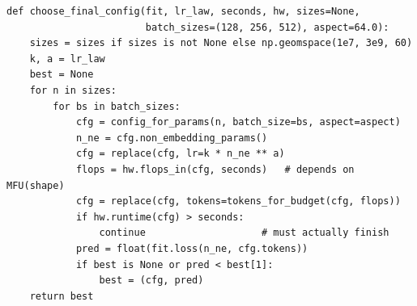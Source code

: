 \begin{lstlisting}[caption={Wall-clock-aware final choice (Lab 15, Task 9).},label={lst:scalinglaws:choose}]
def choose_final_config(fit, lr_law, seconds, hw, sizes=None,
                        batch_sizes=(128, 256, 512), aspect=64.0):
    sizes = sizes if sizes is not None else np.geomspace(1e7, 3e9, 60)
    k, a = lr_law
    best = None
    for n in sizes:
        for bs in batch_sizes:
            cfg = config_for_params(n, batch_size=bs, aspect=aspect)
            n_ne = cfg.non_embedding_params()
            cfg = replace(cfg, lr=k * n_ne ** a)
            flops = hw.flops_in(cfg, seconds)   # depends on MFU(shape)
            cfg = replace(cfg, tokens=tokens_for_budget(cfg, flops))
            if hw.runtime(cfg) > seconds:
                continue                    # must actually finish
            pred = float(fit.loss(n_ne, cfg.tokens))
            if best is None or pred < best[1]:
                best = (cfg, pred)
    return best
\end{lstlisting}

